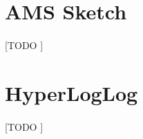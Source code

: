 \documentclass{subfiles}
\begin{document}
    \section{AMS Sketch}
    \label{sec:ams_sketch}

      \paragraph{}
      [TODO ]

    \section{HyperLogLog}
    \label{sec:hyper_log_log}

      \paragraph{}
      [TODO ]
\end{document}
